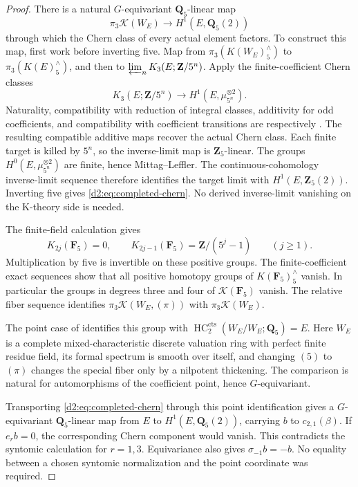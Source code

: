 \documentclass[11pt,a4paper]{amsart}
\numberwithin{equation}{section}
\theoremstyle{definition}
\theoremstyle{remark}
\newcommand{\DtwoZZ}{\mathbf{Z}}
\newcommand{\DtwoQQ}{\mathbf{Q}}
\newcommand{\DtwoFF}{\mathbf{F}}
\newcommand{\DtwocK}{\mathcal K}
\newcommand{\Dtwocts}{\mathrm{cts}}
\DeclareMathOperator{\DtwoHC}{HC}
\begin{document}
\begin{proof}
There is a natural \(G\)-equivariant \(\DtwoQQ_5\)-linear map
\begin{equation}\label{d2:eq:completed-chern}
 \pi_3\DtwocK(W_E)\longrightarrow H^1(E,\DtwoQQ_5(2))
\end{equation}
through which the Chern class of every actual element factors.
To construct this map, first work before inverting five.
Map from \(\pi_3(K(W_E)^\wedge_5)\) to \(\pi_3(K(E)^\wedge_5)\), and then to
\(\varprojlim_nK_3(E;\DtwoZZ/5^n)\).
Apply the finite-coefficient Chern classes
\[
 K_3(E;\DtwoZZ/5^n)\longrightarrow
 H^1(E,\mu_{5^n}^{\otimes2}).
\]
Naturality, compatibility with reduction of integral classes,
additivity for odd coefficients, and compatibility with coefficient
transitions are respectively
\cite[Proposition~2.1.1, Lemma~2.3, Propositions~2.4 and~2.8]{WeibelChern}.
The resulting compatible additive maps recover the actual Chern
class. Each finite target is killed by \(5^n\), so the inverse-limit
map is \(\DtwoZZ_5\)-linear.
The groups \(H^0(E,\mu_{5^n}^{\otimes2})\) are finite, hence
Mittag--Leffler. The continuous-cohomology inverse-limit sequence
therefore identifies the target limit with \(H^1(E,\DtwoZZ_5(2))\).
Inverting five gives \eqref{d2:eq:completed-chern}.
No derived inverse-limit vanishing on the K-theory side is needed.

The finite-field calculation \cite{QuillenFinite}\cite[IV, Corollary~1.13]{Weibel} gives
\[
 K_{2j}(\DtwoFF_5)=0,\qquad
 K_{2j-1}(\DtwoFF_5)=\DtwoZZ/(5^j-1)\qquad(j\ge1).
\]
Multiplication by five is invertible on these positive groups.
The finite-coefficient exact sequences show that all positive
homotopy groups of \(K(\DtwoFF_5)^\wedge_5\) vanish.
In particular the groups in degrees three and four of
\(\DtwocK(\DtwoFF_5)\) vanish.
The relative fiber sequence identifies
\(\pi_3\DtwocK(W_E,(\pi))\) with \(\pi_3\DtwocK(W_E)\).

The point case of
\cite[Theorem~A, Proposition~4.10, Corollary~3.8]{AMMN}
identifies this group with
\(\DtwoHC_2^\Dtwocts(W_E/W_E;\DtwoQQ_5)=E\).
Here \(W_E\) is a complete mixed-characteristic discrete valuation
ring with perfect finite residue field, its formal spectrum is
smooth over itself, and changing \((5)\) to \((\pi)\) changes the
special fiber only by a nilpotent thickening.
The comparison is natural for automorphisms of the coefficient
point, hence \(G\)-equivariant.

Transporting \eqref{d2:eq:completed-chern} through this point
identification gives a \(G\)-equivariant \(\DtwoQQ_5\)-linear map from
\(E\) to \(H^1(E,\DtwoQQ_5(2))\), carrying \(b\) to
\(c_{2,1}(\beta)\).
If \(e_rb=0\), the corresponding Chern component would vanish.
This contradicts the syntomic calculation for \(r=1,3\).
Equivariance also gives \(\sigma_{-1}b=-b\).
No equality between a chosen syntomic normalization and the point
coordinate was required.
\end{proof}
\end{document}

